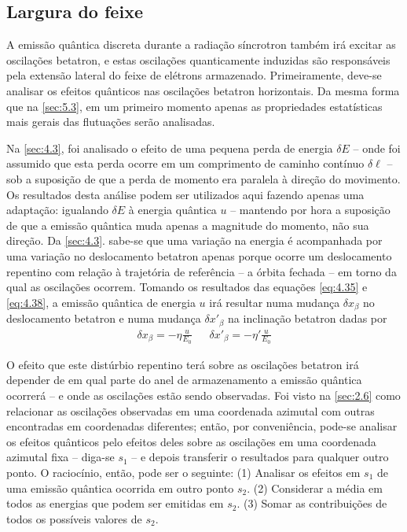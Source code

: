 \subsection{Largura do feixe}\label{sec:5.5}
A emissão quântica discreta durante a radiação síncrotron também irá excitar as oscilações betatron, e estas oscilações quanticamente induzidas são responsáveis pela extensão lateral do feixe de elétrons armazenado. Primeiramente, deve-se analisar os efeitos quânticos nas oscilações betatron horizontais. Da mesma forma que na \autoref{sec:5.3}, em um primeiro momento apenas as propriedades estatísticas mais gerais das flutuações serão analisadas.

Na \autoref{sec:4.3}, foi analisado o efeito de uma pequena perda de energia $\delta E$ -- onde foi assumido que esta perda ocorre em um comprimento de caminho contínuo $\delta \ell$ -- sob a suposição de que a perda de momento era paralela à direção do movimento. Os resultados desta análise podem ser utilizados aqui fazendo apenas uma adaptação: igualando $\delta E$ à energia quântica $u$ -- mantendo por hora a suposição de que a emissão quântica muda apenas a magnitude do momento, não sua direção. Da \autoref{sec:4.3}. sabe-se que uma variação na energia é acompanhada por uma variação no deslocamento betatron apenas porque ocorre um deslocamento repentino com relação à trajetória de referência -- a órbita fechada -- em torno da qual as oscilações ocorrem. Tomando os resultados das equações \eqref{eq:4.35} e \eqref{eq:4.38}, a emissão quântica de energia $u$ irá resultar numa mudança $\delta x_\beta$ no deslocamento betatron e numa mudança $\delta x'_\beta$ na inclinação betatron dadas por
\begin{align}
	\delta x_\beta = -\eta \frac{u}{E_0}\ \ \ \ \ \ \ \delta x'_\beta = -\eta' \frac{u}{E_0}\label{eq:5.67}
\end{align}

O efeito que este distúrbio repentino terá sobre as oscilações betatron irá depender de em qual parte do anel de armazenamento a emissão quântica ocorrerá -- e onde as oscilações estão sendo observadas. Foi visto na \autoref{sec:2.6} como relacionar as oscilações observadas em uma coordenada azimutal com outras encontradas em coordenadas diferentes; então, por conveniência, pode-se analisar os efeitos quânticos pelo efeitos deles sobre as oscilações em uma coordenada azimutal fixa -- diga-se $s_1$ -- e depois transferir o resultados para qualquer outro ponto. O raciocínio, então, pode ser o seguinte: (1) Analisar os efeitos em $s_1$ de uma emissão quântica ocorrida em outro ponto $s_2$. (2) Considerar a média em todos as energias que podem ser emitidas em $s_2$. (3) Somar as contribuições de todos os possíveis valores de $s_2$. 

